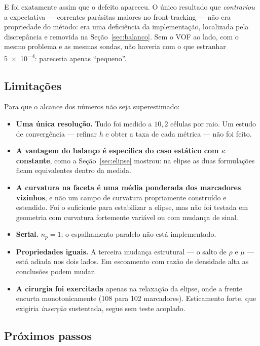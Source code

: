 E foi exatamente assim que o defeito apareceu. O \'unico resultado que
\emph{contrariou} a expectativa --- correntes par\'asitas maiores no
front-tracking --- n\~ao era propriedade do m\'etodo: era uma deficiência da
implementa\c{c}\~ao, localizada pela discrep\^ancia e removida na
Se\c{c}\~ao~\ref{sec:balanco}. Sem o VOF ao lado, com o mesmo problema e as
mesmas sondas, n\~ao haveria com o que estranhar \num{5e-4}: pareceria apenas
``pequeno''.

\subsection{Limita\c{c}\~oes}

Para que o alcance dos n\'umeros n\~ao seja superestimado:

\begin{itemize}
  \item \textbf{Uma \'unica resolu\c{c}\~ao.} Tudo foi medido a $10{,}2$
    c\'elulas por raio. Um estudo de converg\^encia --- refinar $h$ e obter a
    taxa de cada m\'etrica --- n\~ao foi feito.
  \item \textbf{A vantagem do balan\c{c}o \'e espec\'ifica do caso est\'atico
    com $\kappa$ constante}, como a Se\c{c}\~ao~\ref{sec:elipse} mostrou: na
    elipse as duas formula\c{c}\~oes ficam equivalentes dentro da medida.
  \item \textbf{A curvatura na faceta \'e uma m\'edia ponderada dos marcadores
    vizinhos}, e n\~ao um campo de curvatura propriamente constru\'ido e
    estendido. Foi o suficiente para estabilizar a elipse, mas n\~ao foi testada
    em geometria com curvatura fortemente vari\'avel ou com mudan\c{c}a de
    sinal.
  \item \textbf{Serial.} $n_p=1$; o espalhamento paralelo n\~ao est\'a
    implementado.
  \item \textbf{Propriedades iguais.} A terceira mudan\c{c}a estrutural --- o
    salto de $\rho$ e $\mu$ --- est\'a adiada nos dois lados. Em escoamento com
    raz\~ao de densidade alta as conclus\~oes podem mudar.
  \item \textbf{A cirurgia foi exercitada} apenas na relaxa\c{c}\~ao da elipse,
    onde a frente encurta monotonicamente (108 para 102 marcadores). Esticamento
    forte, que exigiria \emph{inser\c{c}\~ao} sustentada, segue sem teste
    acoplado.
\end{itemize}

\subsection{Pr\'oximos passos}

